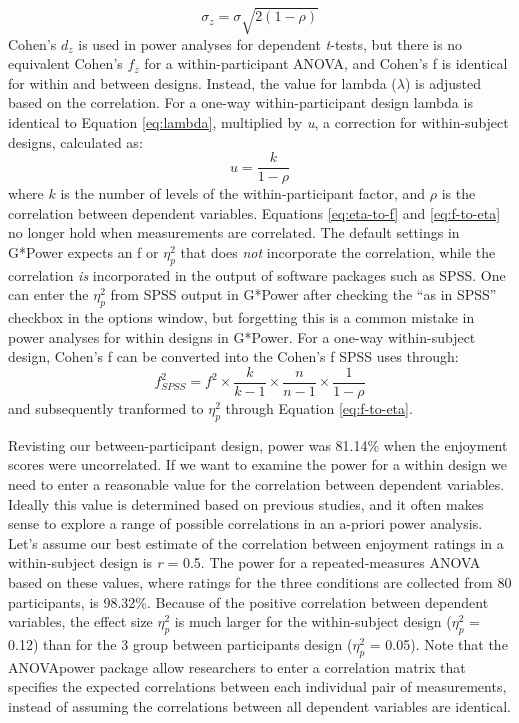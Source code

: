 \documentclass[,jou,floatsintext]{apa6}
\begin{document}
\begin{equation}
\sigma_{z}=\sigma\sqrt{2(1-\rho)}
\end{equation}
Cohen's \(d_z\) is used in power analyses for dependent \emph{t}-tests, but there is no equivalent Cohen's \(f_z\) for a within-participant ANOVA, and Cohen's f is identical for within and between designs.
Instead, the value for lambda (\(\lambda\)) is adjusted based on the correlation.
For a one-way within-participant design lambda is identical to Equation \eqref{eq:lambda}, multiplied by \emph{u}, a correction for within-subject designs, calculated as:
\begin{equation}
u = \frac{k}{1-\rho}
\end{equation}
where \(k\) is the number of levels of the within-participant factor, and \(\rho\) is the correlation between dependent variables.
Equations \eqref{eq:eta-to-f} and \eqref{eq:f-to-eta} no longer hold when measurements are correlated.
The default settings in G*Power expects an f or \(\eta_p^2\) that does \emph{not} incorporate the correlation, while the correlation \emph{is} incorporated in the output of software packages such as SPSS.
One can enter the \(\eta_p^2\) from SPSS output in G*Power after checking the \enquote{as in SPSS} checkbox in the options window, but forgetting this is a common mistake in power analyses for within designs in G*Power.
For a one-way within-subject design, Cohen's f can be converted into the Cohen's f SPSS uses through:
\begin{equation}
f^2_{SPSS} = f^2 \times \frac{k}{k-1} \times \frac{n}{n-1} \times \frac{1}{1-\rho}
\end{equation}
and subsequently tranformed to \(\eta_p^2\) through Equation \eqref{eq:f-to-eta}.

Revisting our between-participant design, power was 81.14\% when the enjoyment scores were uncorrelated.
If we want to examine the power for a within design we need to enter a reasonable value for the correlation between dependent variables.
Ideally this value is determined based on previous studies, and it often makes sense to explore a range of possible correlations in an a-priori power analysis.
Let's assume our best estimate of the correlation between enjoyment ratings in a within-subject design is \emph{r} = 0.5.
The power for a repeated-measures ANOVA based on these values, where ratings for the three conditions are collected from 80 participants, is 98.32\%.
Because of the positive correlation between dependent variables, the effect size \(\eta_p^2\) is much larger for the within-subject design (\(\eta_p^2\) = 0.12) than for the 3 group between participants design (\(\eta_p^2\) = 0.05).
Note that the ANOVApower package allow researchers to enter a correlation matrix that specifies the expected correlations between each individual pair of measurements, instead of assuming the correlations between all dependent variables are identical.
\end{document}
